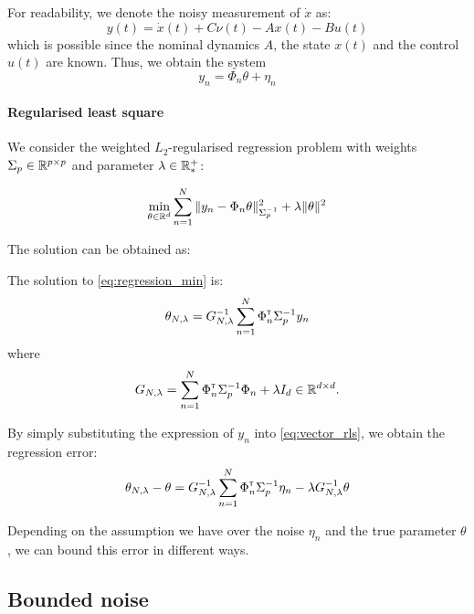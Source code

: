 \documentclass{article}
\begin{document}
For readability, we denote the noisy measurement of $\dot{x}$ as:
\begin{equation}
\label{eq:measurement}
    y(t) = \dot{x}(t) + C\nu(t) - A x(t) - Bu(t)
\end{equation}
which is possible since the nominal dynamics $A$, the state $x(t)$ and the control $u(t)$ are known.
Thus, we obtain the system
\[
y_n = \Phi_n\theta + \eta_n
\]

\paragraph{Regularised least square} We consider the weighted $L_2$-regularised regression problem with weights  $\Sigma_p\in\mathbb{R}^{p\times p}$ and parameter $\lambda\in\mathbb{R}^+_*$:


\begin{equation}
    \label{eq:regression_min}
    \min_{\theta\in\mathbb{R}^d} \sum_{n=1}^N \|y_n -\Phi_n\theta\|_{\Sigma_p^{-1}}^2 + \lambda\|\theta\|_{}^2
\end{equation}


The solution can be obtained as:

\begin{proposition}
\label{prop:regularized_solution}
The solution to \eqref{eq:regression_min} is:
\begin{equation}
    \label{eq:vector_rls}
    \theta_{N,\lambda} = G_{N, \lambda}^{-1} \sum_{n=1}^N \Phi_n^{\mathsf{\scriptscriptstyle T}} \Sigma_p^{-1} y_n
\end{equation}
where 
\begin{equation*}
    G_{N, \lambda} = \sum_{n=1}^N \Phi_{n}^{\mathsf{\scriptscriptstyle T}}\Sigma_p^{-1}\Phi_{n}  + \lambda I_d \in \mathbb{R}^{d\times d}.
\end{equation*}
\end{proposition}

By simply substituting the expression of $y_n$ into \eqref{eq:vector_rls}, we obtain the regression error:
\begin{align}
    \theta_{N,\lambda} - \theta = G_{N, \lambda}^{-1}\sum_{n=1}^N \Phi_n^{\mathsf{\scriptscriptstyle T}} \Sigma_p^{-1}\eta_n - \lambda G_{N, \lambda}^{-1}\theta 
\end{align}

Depending on the assumption we have over the noise $\eta_n$ and the true parameter $\theta$, we can bound this error in different ways.


\subsection{Bounded noise}
\end{document}
